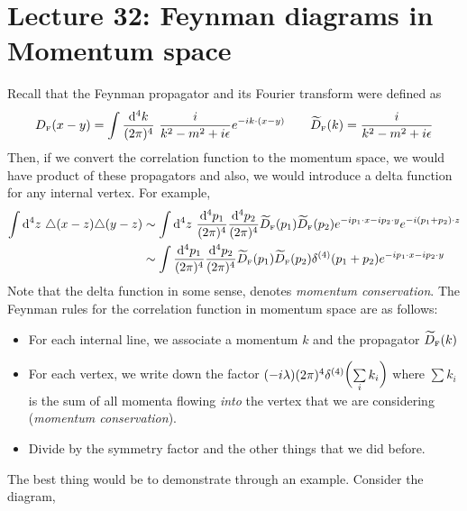 \section*{Lecture 32: Feynman diagrams in Momentum space}
Recall that the Feynman propagator and its Fourier transform were defined as 
$$D_{\text{\tiny F}}(x-y) = \int \frac{\dd^4 k}{(2\pi)^4}\ \frac{i}{k^2-m^2+i\epsilon} e^{-ik\cdot (x-y)}\qquad \widetilde{D}_{\text{\tiny F}}(k) = \frac{i}{k^2-m^2+i\epsilon}$$
Then, if we convert the correlation function to the momentum space, we would have product of these propagators and also, we would introduce a delta function for any internal vertex. For example, 
\begin{align*}
    \int \dd^4 z \ \triangle(x-z) \triangle(y-z) &\sim \int \dd^4 z \  \frac{\dd^4 p_1}{(2\pi)^4}\frac{\dd^4 p_2}{(2\pi)^4} \widetilde{D}_{\text{\tiny F}}(p_1) \widetilde{D}_{\text{\tiny F}}(p_2) e^{-i p_1\cdot x-i p_2\cdot y} e^{-i (p_1+p_2)\cdot z}\\
    &\sim \int \frac{\dd^4 p_1}{(2\pi)^4}\frac{\dd^4 p_2}{(2\pi)^4} \widetilde{D}_{\text{\tiny F}}(p_1) \widetilde{D}_{\text{\tiny F}}(p_2)  \delta^{(4)}(p_1+p_2)e^{-i p_1\cdot x-i p_2\cdot y}
\end{align*}
Note that the delta function in some sense, denotes \textit{momentum conservation}. The Feynman rules for the correlation function in momentum space are as follows: 
\begin{itemize}
    \item For each internal line, we associate a momentum $k$ and the propagator $\widetilde{D}_{\text{\tiny F}}(k)$
    \item For each vertex, we write down the factor $(-i\lambda)(2\pi)^4 \delta^{(4)}\qty(\sum\limits_i k_i)$ where $\sum k_i$ is the sum of all momenta flowing \textit{into} the vertex that we are considering (\textit{momentum conservation}). 
    \item Divide by the symmetry factor and the other things that we did before.
\end{itemize}
The best thing would be to demonstrate through an example. Consider the diagram, 
